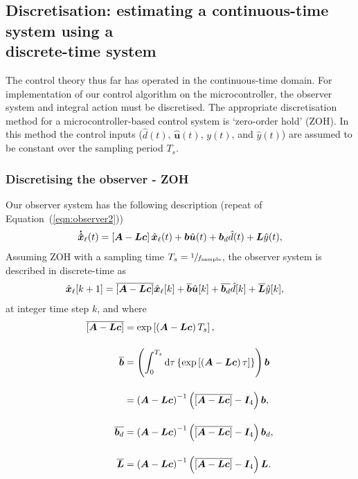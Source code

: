 \subsection{Discretisation: estimating a continuous-time system using a \\ discrete-time system}\label{sec:disc}
The control theory thus far has operated in the continuous-time domain. For implementation of our control algorithm on the microcontroller, the observer system and integral action must be discretised. The appropriate discretisation method for a microcontroller-based control system is `zero-order hold' (ZOH). In this method the control inputs ($\hat{d}(t)$, $\hat{\boldsymbol{u}}(t)$, $y(t)$, and $\hat{y}(t)$) are assumed to be constant over the sampling period $T_s$.
\subsubsection{Discretising the observer - ZOH}
Our observer system has the following description (repeat of Equation~(\ref{eqn:observer2}))
\begin{align}
\boldsymbol{\dot{\hat{x}}}_\ell (t) = \left[\boldsymbol{A} - \boldsymbol{L}\boldsymbol{c}\right]\hat{\boldsymbol{x}}_\ell(t) + \boldsymbol{b}\hat{\boldsymbol{u}}(t) + \boldsymbol{b}_d \hat{d}(t) + \boldsymbol{L}\hat{y}(t),
\end{align}
Assuming ZOH with a sampling time $T_s = \sfrac{1}{f_\text{sample}}$, the observer system is described in discrete-time as
\begin{align}
\hat{\boldsymbol{x}}_\ell [k + 1] &= \overline{\left[\boldsymbol{A} - \boldsymbol{L}\boldsymbol{c}\right]}\hat{\boldsymbol{x}}_\ell[k] + \overline{\boldsymbol{b}}\hat{\boldsymbol{u}}[k] + \overline{\boldsymbol{b}_d} \hat{d}[k] + \overline{\boldsymbol{L}}\hat{y}[k],\label{eqn:observer_discrete}
\end{align}
at integer time step $k$, and where
\begingroup
\allowdisplaybreaks
\begin{align}
\overline{\left[\boldsymbol{A} - \boldsymbol{L}\boldsymbol{c}\right]} &= \exp \left[\left(\boldsymbol{A} - \boldsymbol{L}\boldsymbol{c}\right)T_s\right],
\\[11pt]
\overline{\boldsymbol{b}} &= \left(\int_0^{T_s} \mathrm{d}\tau \left\{\exp \left[\left(\boldsymbol{A} - \boldsymbol{L}\boldsymbol{c}\right)\tau\right]\right\}\right)\boldsymbol{b}\nonumber
\\[11pt]
&= \left(\boldsymbol{A} - \boldsymbol{L}\boldsymbol{c}\right)^{-1}
\left(\overline{\left[\boldsymbol{A} - \boldsymbol{L}\boldsymbol{c}\right]} - \boldsymbol{I}_4\right)
\boldsymbol{b},
\\[11pt]
\overline{\boldsymbol{b}_d} &=
\left(\boldsymbol{A} - \boldsymbol{L}\boldsymbol{c}\right)^{-1}
\left(\overline{\left[\boldsymbol{A} - \boldsymbol{L}\boldsymbol{c}\right]} - \boldsymbol{I}_4\right)
\boldsymbol{b}_d,
\\[11pt]
\overline{\boldsymbol{L}} &=
\left(\boldsymbol{A} - \boldsymbol{L}\boldsymbol{c}\right)^{-1}
\left(\overline{\left[\boldsymbol{A} - \boldsymbol{L}\boldsymbol{c}\right]} - \boldsymbol{I}_4\right)
\boldsymbol{L}.
\end{align}
